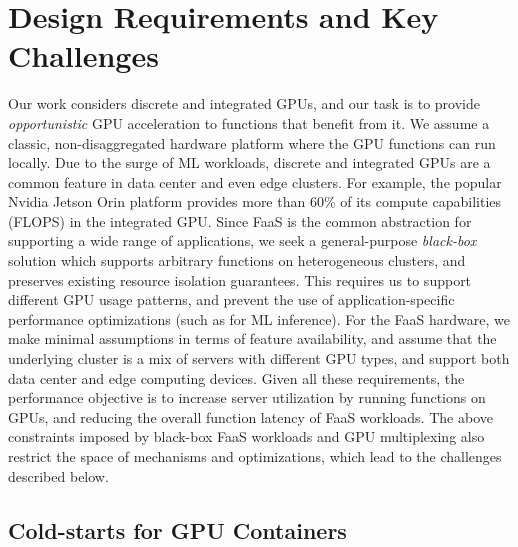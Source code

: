 \section{Design Requirements and Key Challenges}
\label{sec:motiv}

Our work considers discrete and integrated GPUs, and our task is to provide \emph{opportunistic} GPU acceleration to functions that benefit from it.
We assume a classic, non-disaggregated hardware platform where the GPU functions can run locally. 
Due to the surge of ML workloads, discrete and integrated GPUs are a common feature in data center and even edge clusters. 
For example, the popular Nvidia Jetson Orin platform provides more than 60\% of its compute capabilities (FLOPS) in the integrated GPU.
Since FaaS is the common abstraction for supporting a wide range of applications, we seek a general-purpose \emph{black-box} solution which supports arbitrary functions on heterogeneous clusters, and preserves existing resource isolation guarantees. 
This requires us to support different GPU usage patterns, and prevent the use of application-specific performance optimizations (such as for ML inference). 
For the FaaS hardware, we make minimal assumptions in terms of feature availability, and assume that the underlying cluster is a mix of servers with different GPU types, and support both data center and edge computing devices. 
Given all these requirements, the performance objective is to increase server utilization by running functions on GPUs, and reducing the overall function latency of FaaS workloads. 
The above constraints imposed by black-box FaaS workloads and GPU multiplexing also restrict the space of mechanisms and optimizations, which lead to the challenges described below. 



\subsection{Cold-starts for GPU Containers}

